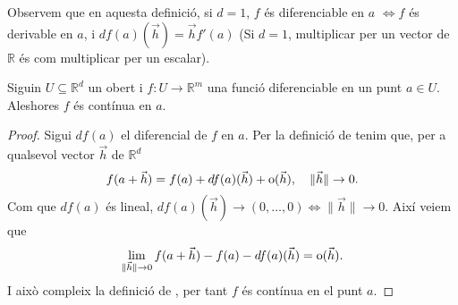 \documentclass[../Apunts.tex]{subfiles}
\begin{document}
	\begin{observation}
		Observem que en aquesta definició, si \(d=1\), \(f\) és diferenciable en \(a\) \(\Longleftrightarrow f\) és derivable en \(a\), i \(df(a)(\vec{h})=\vec{h}f'(a)\) (Si \(d=1\), multiplicar per un vector de \(\mathbb{R}\) és com multiplicar per un escalar).
	\end{observation}
	\begin{proposition}
		\label{prop:Diferenciable implica contínua}
		Siguin \(U\subseteq\mathbb{R}^{d}\) un obert i \(f\colon U\to\mathbb{R}^{m}\) una funció diferenciable en un punt \(a\in U\). Aleshores \(f\) és contínua en \(a\).
		\begin{proof}
			Sigui \(df(a)\) el diferencial de \(f\) en \(a\). Per la definició de  tenim que, per a qualsevol vector \(\vec{h}\) de \(\mathbb{R}^d\)
			\[f(a+\vec{h})=f(a)+df(a)(\vec{h})+\operatorname{o}(\vec{h}),\quad \lVert\vec{h}\rVert\to0.\]
			Com que \(df(a)\) és lineal, \(df(a)(\vec{h})\to(0,\dots,0)\Leftrightarrow\lVert\vec{h}\rVert\to0\). Així veiem que
			\[\lim_{\lVert\vec{h}\rVert\to0}f(a+\vec{h})-f(a)-df(a)(\vec{h})=\operatorname{o}(\vec{h}).\]
			I això compleix la definició de , per tant \(f\) és contínua en el punt \(a\).
		\end{proof}
	\end{proposition}
\end{document}
